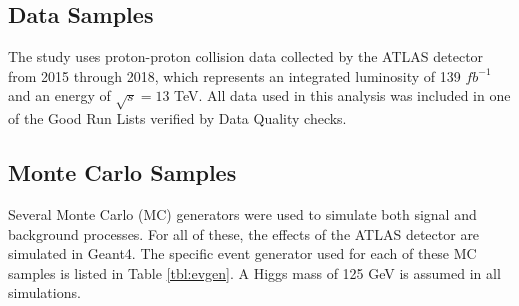 
\subsection{Data Samples}

The study uses proton-proton collision data collected by the ATLAS detector from 2015 through 2018, which represents an integrated luminosity of 139 $fb^{-1}$ and an energy of $\sqrt{s} = 13$ TeV. All data used in this analysis was included in one of the Good Run Lists verified by Data Quality checks.

\subsection{Monte Carlo Samples}
\label{sec:MCsamples}

Several Monte Carlo (MC) generators were used to simulate both signal and background processes. For all of these, the effects of the ATLAS detector are simulated in Geant4. The specific event generator used for each of these MC samples is listed in Table \ref{tbl:evgen}. A Higgs mass of 125 GeV is assumed in all simulations.

